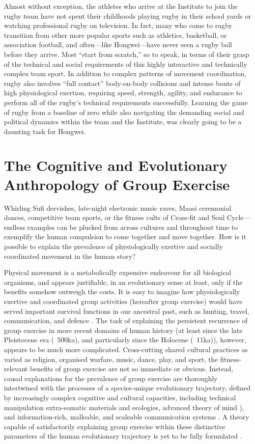 Almost without exception, the athletes who arrive at the Institute to join the rugby team have not spent their childhoods playing rugby in their school yards or watching professional rugby on television.  In fact, many who come to rugby transition from other more popular sports such as athletics, basketball, or association football, and often---like Hongwei---have never seen a rugby ball before they arrive.  Most ``start from scratch,'' so to speak, in terms of their grasp of the technical and social requirements of this highly interactive and technically complex team sport. In addition to complex patterns of movement coordination, rugby also involves ``full contact'' body-on-body collisions and intense bouts of high physiological exertion, requiring speed, strength, agility, and endurance to perform all of the rugby's technical requirements successfully.  Learning the game of rugby from a baseline of zero while also navigating the demanding social and political dynamics within the team and the Institute, was clearly going to be a daunting task for Hongwei.


\section{The Cognitive and Evolutionary Anthropology of Group Exercise}
Whirling Sufi dervishes, late-night electronic music raves, Maasi ceremonial dances, competitive team sports, or the fitness cults of Cross-fit and Soul Cycle---endless examples can be plucked from across cultures and throughout time to exemplify the human compulsion to come together and move together.  How is it possible to explain the prevalence of physiologically exertive and socially coordinated movement in the human story?

Physical movement is a metabolically expensive endeavour for all biological organisms,  and appears justifiable, in an evolutionary sense at least, only if the benefits somehow outweigh the costs.  It is easy to imagine how physiologically exertive and coordinated group activities (hereafter group exercise) would have served important survival functions in our ancestral past, such as hunting, travel, communication, and defence \citep{Sands2010}.  The task of explaining the persistent recurrence of group exercise in more recent domains of human history (at least since the late Pleistocene era (~500ka), and particularly since the Holocene (~11ka)), however, appears to be much more complicated.  Cross-cutting shared cultural practices as varied as religion, organised warfare, music, dance, play, and sport, the fitness-relevant benefits of group exercise are not so immediate or obvious.  Instead, causal explanations for the prevalence of group exercise are thoroughly intertwined with the processes of a species-unique evolutionary trajectory, defined by increasingly complex cognitive and cultural capacities, including technical manipulation extra-somatic materials and ecologies, advanced theory of mind \citep{Tomasello1999}), and information-rich, malleable, and scaleable communication systems \citep{Fuentes2016}.  A theory capable of satisfactorily explaining group exercise within these distinctive parameters of the human evolutionary trajectory is yet to be fully formulated \citep{Cohen2017}.


